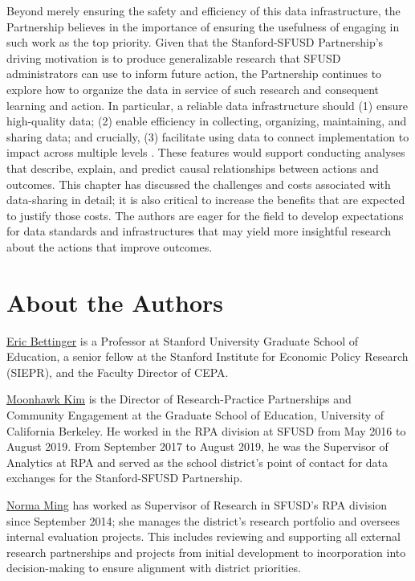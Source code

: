 Beyond merely ensuring the safety and efficiency of this data infrastructure, the Partnership believes in the importance of ensuring the usefulness of engaging in such work as the top priority. Given that the Stanford-SFUSD Partnership's driving motivation is to produce generalizable research that SFUSD administrators can use to inform future action, the Partnership continues to explore how to organize the data in service of such research and consequent learning and action. In particular, a reliable data infrastructure should (1) ensure high-quality data; (2) enable efficiency in collecting, organizing, maintaining, and sharing data; and crucially, (3) facilitate using data to connect implementation to impact across multiple levels \citep{ming2019}. These features would support conducting analyses that describe, explain, and predict causal relationships between actions and outcomes. This chapter has discussed the challenges and costs associated with data-sharing in detail; it is also critical to increase the benefits that are expected to justify those costs. The authors are eager for the field to develop expectations for data standards and infrastructures that may yield more insightful research about the actions that improve outcomes.

\hypertarget{about-the-authors-6}{%
\section*{About the Authors}\label{about-the-authors-6}}

\href{https://ed.stanford.edu/faculty/ebetting}{Eric Bettinger} is a Professor at Stanford University Graduate School of Education, a senior fellow at the Stanford Institute for Economic Policy Research (SIEPR), and the Faculty Director of CEPA.

\href{https://gse.berkeley.edu/moonhawk-kim}{Moonhawk Kim} is the Director of Research-Practice Partnerships and Community Engagement at the Graduate School of Education, University of California Berkeley. He worked in the RPA division at SFUSD from May 2016 to August 2019. From September 2017 to August 2019, he was the Supervisor of Analytics at RPA and served as the school district's point of contact for data exchanges for the Stanford-SFUSD Partnership.

\href{https://orcid.org/0000-0002-7991-5929}{Norma Ming} has worked as Supervisor of Research in SFUSD's RPA division since September 2014; she manages the district's research portfolio and oversees internal evaluation projects. This includes reviewing and supporting all external research partnerships and projects from initial development to incorporation into decision-making to ensure alignment with district priorities.

